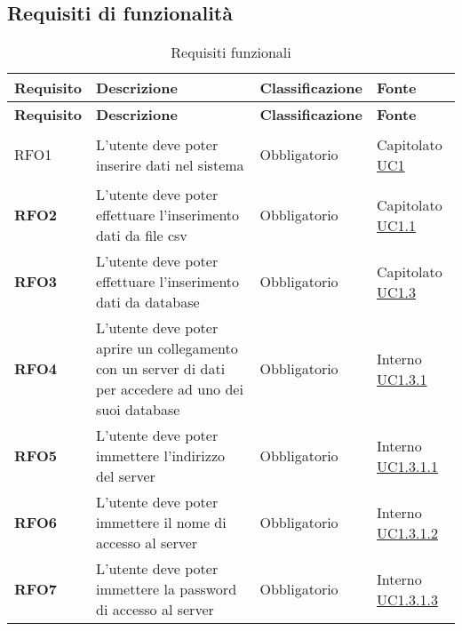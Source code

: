 \subsection{Requisiti di funzionalità}
\label{sub:requisiti_di_funzionalita}

\renewcommand{\arraystretch}{2} %
\begin{longtable}[H]{>{\centering\bfseries}m{2cm} >{\centering}m{9cm} >{\centering}m{2.5cm} >{\centering\arraybackslash}m{2.5cm}}
    \caption{Requisiti funzionali}%
    \label{tab:requisiti_funzionali} \\
    \rowcolor{lightgray}
    {\textbf{Requisito}} & {\textbf{Descrizione}} & {\textbf{Classificazione}} & {\textbf{Fonte}}  \\
    \endfirsthead%
    \rowcolor{lightgray}
    {\textbf{Requisito}} & {\textbf{Descrizione}} & {\textbf{Classificazione}} & {\textbf{Fonte}}  \\
    \endhead%
    \rowcolor{white}
    \multicolumn{4}{c}{\textit{Continua alla pagina successiva}}
    \endfoot%
    \endlastfoot%

    RFO1
    & L'utente deve poter inserire dati nel sistema
    & Obbligatorio
    & Capitolato \hyperref[sub:uc1]{UC1} \\

    RFO2
    & L'utente deve poter effettuare l'inserimento dati da file csv
    & Obbligatorio
    & Capitolato  \hyperref[ssub:uc1.1]{UC1.1} \\

    RFO3
    & L'utente deve poter effettuare l'inserimento dati da database
    & Obbligatorio
    & Capitolato \hyperref[ssub:uc1.3]{UC1.3}\\

    RFO4
    &   L'utente deve poter aprire un collegamento con un server di dati per
        accedere ad uno dei suoi database
    & Obbligatorio
    & Interno  \hyperref[par:uc1.3.1]{UC1.3.1}\\

    RFO5
    &   L'utente deve poter immettere l'indirizzo del server
    & Obbligatorio
    & Interno  \hyperref[spar:uc1.3.1.1]{UC1.3.1.1}\\

    RFO6
    &   L'utente deve poter immettere il nome di accesso al server
    & Obbligatorio
    & Interno  \hyperref[spar:uc1.3.1.2]{UC1.3.1.2}\\

    RFO7
    &   L'utente deve poter immettere la password di accesso al server
    & Obbligatorio
    & Interno  \hyperref[spar:uc1.3.1.3]{UC1.3.1.3}\\


\end{longtable}
